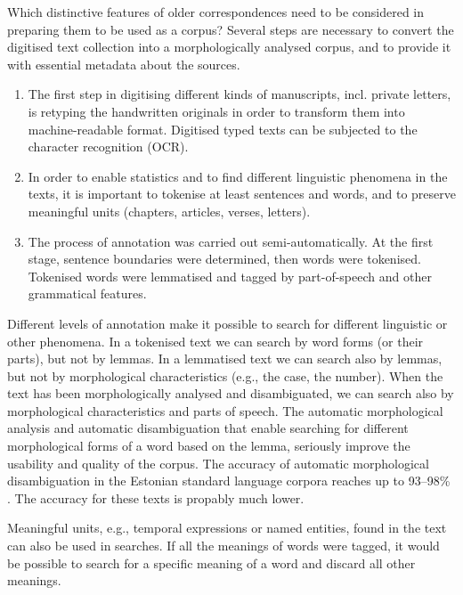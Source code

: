 \documentclass[runningheads]{llncs}
\begin{document}
Which distinctive features of older correspondences need to be considered in preparing them to be used as a corpus? Several steps are necessary to convert the digitised text collection into a morphologically analysed corpus, and to provide it with essential metadata about the sources.

\begin{enumerate}
\item The first step in digitising different kinds of manuscripts, incl. private letters, is retyping the handwritten originals in order to transform them into machine-readable format. Digitised typed texts can be subjected to the character recognition (OCR). 

\item In order to enable statistics and to find different linguistic phenomena in the texts, it is important to tokenise at least sentences and words, and to preserve meaningful units (chapters, articles, verses, letters). 

  \item The process of annotation was carried out semi-automatically. At the first stage, sentence boundaries were determined, then words were tokenised. Tokenised words were lemmatised and tagged by part-of-speech and other grammatical features.

\end{enumerate}

Different levels of annotation make it possible to search for different linguistic or other phenomena. In a tokenised text we can search by word forms (or their parts), but not by lemmas. In a lemmatised text we can search also by lemmas, but not by morphological characteristics (e.g., the case, the number). When the text has been morphologically analysed and disambiguated, we can search also by morphological characteristics and parts of speech. The automatic morphological analysis and automatic disambiguation that enable searching for different morphological forms of a word based on the lemma, seriously improve the usability and quality of the corpus. The accuracy of automatic morphological disambiguation in the Estonian standard language corpora reaches up to 93--98\% \cite{veskisliba}.  The accuracy for these texts is propably much lower.


Meaningful units, e.g., temporal expressions or named entities, found in the text can also be used in searches. If all the meanings of words were tagged, it would be possible to search for a specific meaning of a word and discard all other meanings. 
\end{document}
